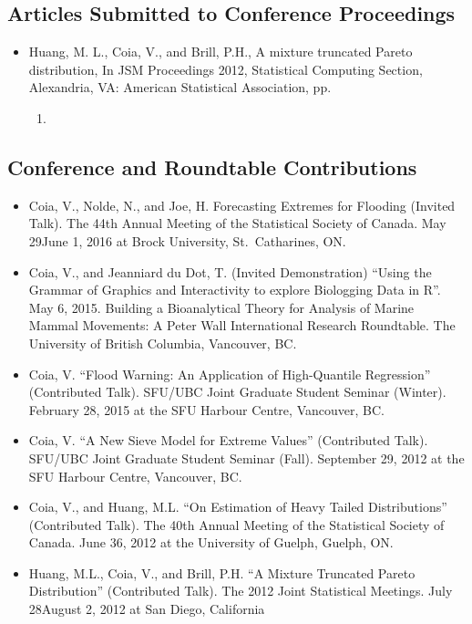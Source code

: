 \documentclass[]{book}
\providecommand{\tightlist}{%
  \setlength{\itemsep}{0pt}\setlength{\parskip}{0pt}}
\begin{document}
\hypertarget{articles-submitted-to-conference-proceedings}{%
\subsection{Articles Submitted to Conference Proceedings}\label{articles-submitted-to-conference-proceedings}}

\begin{itemize}
\tightlist
\item
  Huang, M. L., Coia, V., and Brill, P.H., A mixture truncated
  Pareto distribution, In JSM Proceedings 2012, Statistical Computing
  Section, Alexandria, VA: American Statistical Association, pp.

  \begin{enumerate}
  \def\labelenumi{\arabic{enumi}.}
  \setcounter{enumi}{24882497}
  \item
  \end{enumerate}
\end{itemize}

\hypertarget{conference-and-roundtable-contributions}{%
\subsection{Conference and Roundtable Contributions}\label{conference-and-roundtable-contributions}}

\begin{itemize}
\item
  Coia, V., Nolde, N., and Joe, H. Forecasting Extremes for Flooding
  (Invited Talk). The 44th Annual Meeting of the Statistical Society
  of Canada. May 29June 1, 2016 at Brock University, St.~Catharines,
  ON.
\item
  Coia, V., and Jeanniard du Dot, T. (Invited Demonstration) ``Using
  the Grammar of Graphics and Interactivity to explore Biologging Data
  in R''. May 6, 2015. Building a Bioanalytical Theory for Analysis of
  Marine Mammal Movements: A Peter Wall International Research
  Roundtable. The University of British Columbia, Vancouver, BC.
\item
  Coia, V. ``Flood Warning: An Application of High-Quantile Regression''
  (Contributed Talk). SFU/UBC Joint Graduate Student Seminar (Winter).
  February 28, 2015 at the SFU Harbour Centre, Vancouver, BC.
\item
  Coia, V. ``A New Sieve Model for Extreme Values'' (Contributed Talk).
  SFU/UBC Joint Graduate Student Seminar (Fall). September 29, 2012 at
  the SFU Harbour Centre, Vancouver, BC.
\item
  Coia, V., and Huang, M.L. ``On Estimation of Heavy Tailed
  Distributions'' (Contributed Talk). The 40th Annual Meeting of the
  Statistical Society of Canada. June 36, 2012 at the University of
  Guelph, Guelph, ON.
\item
  Huang, M.L., Coia, V., and Brill, P.H. ``A Mixture Truncated Pareto
  Distribution'' (Contributed Talk). The 2012 Joint Statistical
  Meetings. July 28August 2, 2012 at San Diego, California
\end{itemize}
\end{document}
